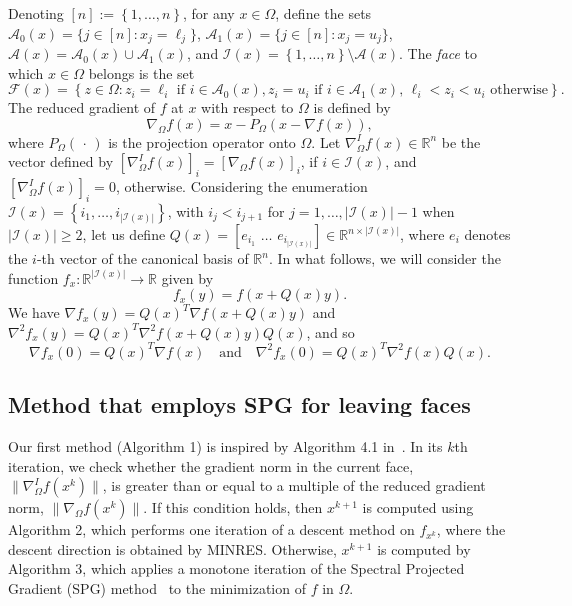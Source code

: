 \documentclass[11pt]{article}
\begin{document}
Denoting $[n]:=\left\{1,\ldots,n\right\}$, for any $x\in\Omega$, define the sets $\mathcal{A}_{0}(x)=\{j\in [n] : x_{j}=\ell_{j}\}$, $\mathcal{A}_{1}(x)=\{j\in [n] : x_{j}=u_{j}\}$, $\mathcal{A}(x)=\mathcal{A}_{0}(x)\cup\mathcal{A}_{1}(x)$, and $\mathcal{I}(x)=\left\{1,\dots,n\right\}\setminus\mathcal{A}(x)$. The \textit{face} to which $x \in \Omega$ belongs is the set 
\[
\mathcal{F}(x)=\left\{z\in\Omega : z_{i}=\ell_{i} \text{ if } i\in\mathcal{A}_{0}(x), z_{i}=u_{i} \text{ if } i\in\mathcal{A}_{1}(x),\,\ell_{i}<z_{i}<u_{i} \text{ otherwise}\right\}. 
\]
The reduced gradient of $f$ at $x$ with respect to $\Omega$ is defined by 
\[
\nabla_{\Omega}f(x)=x-P_{\Omega}(x-\nabla f(x)),
\]
where $P_{\Omega}(\,\cdot\,)$ is the projection operator onto $\Omega$. Let $\nabla_{\Omega}^{I}f(x)\in\mathbb{R}^{n}$ be the vector defined by $\left[\nabla_{\Omega}^{I}f(x)\right]_{i} = [\nabla_{\Omega}f(x)]_{i}$, if $i\in \mathcal{I}(x)$, and $\left[\nabla_{\Omega}^{I}f(x)\right]_{i} = 0$, otherwise. Considering the enumeration $\mathcal{I}(x)=\left\{i_{1},\dots,i_{|\mathcal{I}(x)|}\right\}$, with $i_{j}<i_{j+1}$ for $j=1,\dots,|\mathcal{I}(x)|-1$ when $|\mathcal{I}(x)|\geq 2$, let us define $Q(x)=\left[e_{i_{1}}\,\,\dots\,\,e_{i_{|\mathcal{I}(x)|}}\right]\in\mathbb{R}^{n\times |\mathcal{I}(x)|}$, where $e_{i}$ denotes the $i$-th vector of the canonical basis of $\mathbb{R}^{n}$. In what follows, we will consider the function $f_{x}:\mathbb{R}^{|\mathcal{I}(x)|}\to\mathbb{R}$ given by
\begin{equation}
f_{x}(y)=f(x+Q(x)y).
\label{eq:fx}
\end{equation}
We have $\nabla f_{x}(y)=Q(x)^{T}\nabla f(x+Q(x)y)$ and $\nabla^{2}f_{x}(y)=Q(x)^{T}\nabla^{2}f(x+Q(x)y)Q(x)$,
and so 
\begin{equation}
\nabla f_{x}(0)=Q(x)^{T}\nabla f(x)\quad\text{and}\quad\nabla^{2} f_{x}(0)=Q(x)^{T}\nabla^{2} f(x)Q(x).
\label{eq:gx}
\end{equation}

\subsection{Method that employs SPG for leaving faces} \label{sec21}

Our first method (Algorithm 1) is inspired by Algorithm 4.1 in~\cite{BM}. In its $k$th iteration, we check whether the gradient norm in the current face, $\|\nabla_{\Omega}^{I} f(x^{k})\|$, is greater than or equal to a multiple of the reduced gradient norm, $\|\nabla_{\Omega} f(x^{k})\|$. If this condition holds, then $x^{k+1}$ is computed using Algorithm 2, which performs one iteration of a descent method on $f_{x^{k}}$, where the descent direction is obtained by MINRES. Otherwise, $x^{k+1}$ is computed by Algorithm 3, which applies a monotone iteration of the Spectral Projected Gradient (SPG) method~\cite{Birgin2000} to the minimization of $f$ in $\Omega$.
\end{document}
